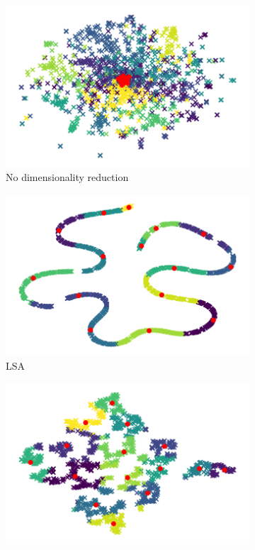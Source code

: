\begin{figure}
\centering
\begin{subfigure}{.3\textwidth}
    \centering
    \includegraphics[width=\linewidth]{imgs/kmeans.png}
    \caption{No dimensionality reduction}
    \label{fig:kmeans_no_dim}
\end{subfigure}
\begin{subfigure}{.3\textwidth}
  \centering
  \includegraphics[width=\linewidth]{imgs/kmeans_lsa.png}
  \caption{LSA}
  \label{fig:kmeans_lsa}
\end{subfigure}%
\begin{subfigure}{.3\textwidth}
  \centering
  \includegraphics[width=\linewidth]{imgs/kmeans_spectral.png}

\end{subfigure}
\end{figure}
